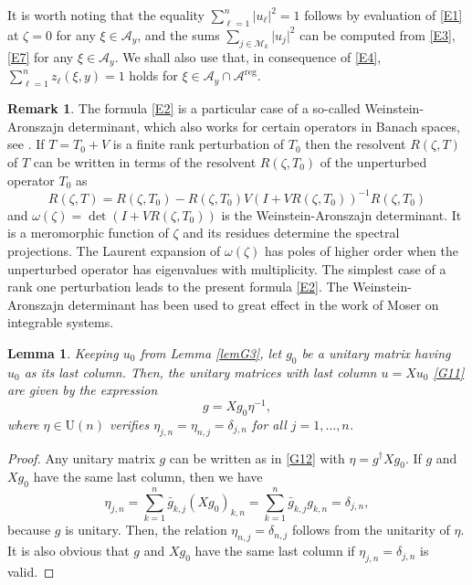 \documentclass[a4paper,11pt,reqno]{amsart}
\newtheorem{lem}[thm]{Lemma}
\theoremstyle{definition}
\newtheorem{rem}[thm]{Remark}
\numberwithin{equation}{section}
\newcommand{\be}{\begin{equation}}
\newcommand{\ee}{\end{equation}}
\def\cA{{\mathcal A}}                       %
\def\reg{\mathrm{reg}}                      %
\def\U{\mathrm{U}}                          %
\def\reg{\mathrm{reg}}                      %
\def\cM{{\mathcal M}}                       %
\begin{document}
It is worth noting that the equality $\sum_{\ell =1}^n  \vert u_\ell \vert^2 =1$ follows by evaluation of \eqref{E1}
at $\zeta=0$ for any $\xi \in \cA_y$, and the sums $\sum_{j \in \cM_k}\vert u_j \vert^2$ can be computed
 from \eqref{E3}, \eqref{E7} for any $\xi \in \cA_y$.
We shall also use that, in consequence of \eqref{E4},  $\sum_{\ell=1}^n z_\ell(\xi,y) =1$ holds for
 $\xi\in \cA_y \cap \cA^\reg$.


\begin{rem}
The formula \eqref{E2} is a particular case of a so-called Weinstein-Aronszajn determinant, which also works for certain operators in Banach spaces, see \cite{Kato}.
If $T = T_0 + V$ is a finite rank perturbation of $T_0$ then the resolvent $R(\zeta,T)$ of $T$ can
be written in terms of the resolvent $R(\zeta, T_0)$ of the unperturbed operator $T_0$ as
\be
   R(\zeta,T) = R(\zeta,T_0) - R(\zeta, T_0) V ( I + VR(\zeta,T_0))^{-1} R(\zeta, T_0)
\ee
and $\omega(\zeta) = \det( I + V R(\zeta, T_0))$ is the Weinstein-Aronszajn determinant.
It is a meromorphic function of $\zeta$ and its residues determine the spectral projections. The Laurent expansion of
 $\omega(\zeta)$ has poles of higher order when the unperturbed operator has eigenvalues with multiplicity.
 The simplest case of a rank one perturbation leads to the present formula \eqref{E2}. The Weinstein-Aronszajn determinant has been used to great effect in
 the work of Moser \cite{Moser79ChernSymposium} on integrable systems.
\end{rem}


\begin{lem}\label{lemG4}
Keeping $u_0$ from Lemma \ref{lemG3}, let $g_0$ be a unitary matrix having $u_0$ as its last column.
Then, the unitary matrices with last column $u = X u_0$ \eqref{G11} are given by the expression
\be
g = X g_0 \eta^{-1},
\label{G12}\ee
where $\eta \in \U(n)$ verifies $\eta_{j,n} = \eta_{n,j} = \delta_{j,n}$ for all $j=1,\dots, n$.
\end{lem}
\begin{proof}
Any unitary matrix $g$ can be written as in \eqref{G12} with
$\eta = g^\dagger Xg_0$. If $g$ and $X g_0$ have the same last column, then we have
\be
\eta_{j,n} = \sum_{k=1}^n \bar g_{k,j} (Xg_0)_{k,n} = \sum_{k=1}^n \bar g_{k,j} g_{k,n} = \delta_{j,n},
\label{G15}\ee
because $g$ is unitary.  Then, the relation $\eta_{n,j} = \delta_{n,j}$ follows from the unitarity of $\eta$.
It is also obvious that $g$ and $Xg_0$ have the same last column if $\eta_{j,n} = \delta_{j,n}$ is valid.
\end{proof}
\end{document}
